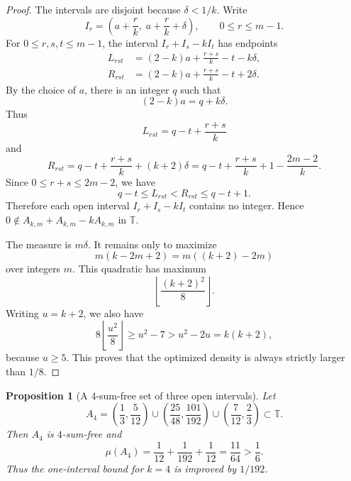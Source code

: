 \documentclass{article}
\newtheorem{proposition}{Proposition}
\begin{document}
\begin{proof}
The intervals are disjoint because \(\delta<1/k\). Write
\[
    I_r=\left(a+\frac r k,\; a+\frac r k+\delta\right),
    \qquad 0\leq r\leq m-1.
\]
For \(0\leq r,s,t\leq m-1\), the interval \(I_r+I_s-kI_t\) has endpoints
\begin{align*}
    L_{rst}
    &=
    (2-k)a+\frac{r+s}{k}-t-k\delta, \\
    R_{rst}
    &=
    (2-k)a+\frac{r+s}{k}-t+2\delta.
\end{align*}
By the choice of \(a\), there is an integer \(q\) such that
\[
    (2-k)a=q+k\delta.
\]
Thus
\[
    L_{rst}=q-t+\frac{r+s}{k}
\]
and
\[
    R_{rst}
    =
    q-t+\frac{r+s}{k}+(k+2)\delta
    =
    q-t+\frac{r+s}{k}+1-\frac{2m-2}{k}.
\]
Since \(0\leq r+s\leq 2m-2\), we have
\[
    q-t
    \leq L_{rst}
    <
    R_{rst}
    \leq q-t+1.
\]
Therefore each open interval \(I_r+I_s-kI_t\) contains no integer. Hence
\(0\notin A_{k,m}+A_{k,m}-kA_{k,m}\) in \(\mathbb T\).

The measure is \(m\delta\). It remains only to maximize
\[
    m(k-2m+2)=m((k+2)-2m)
\]
over integers \(m\). This quadratic has maximum
\[
    \left\lfloor \frac{(k+2)^2}{8}\right\rfloor.
\]
Writing \(u=k+2\), we also have
\[
    8\left\lfloor \frac{u^2}{8}\right\rfloor
    \geq u^2-7
    >
    u^2-2u
    =
    k(k+2),
\]
because \(u\geq 5\). This proves that the optimized density is always strictly
larger than \(1/8\).
\end{proof}

\begin{proposition}[A \(4\)-sum-free set of three open intervals]
Let
\[
    A_4=
    \left(\frac13,\frac5{12}\right)
    \cup
    \left(\frac{25}{48},\frac{101}{192}\right)
    \cup
    \left(\frac7{12},\frac23\right)
    \subset \mathbb T.
\]
Then \(A_4\) is \(4\)-sum-free and
\[
    \mu(A_4)
    =
    \frac1{12}+\frac1{192}+\frac1{12}
    =
    \frac{11}{64}
    >
    \frac16.
\]
Thus the one-interval bound for \(k=4\) is improved by \(1/192\).
\end{proposition}
\end{document}
